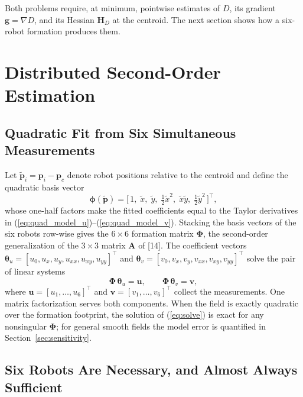 \documentclass[lettersize,journal]{IEEEtran}
\begin{document}
Both problems require, at minimum, pointwise estimates of $D$, its
gradient $\mathbf{g} = \nabla D$, and its Hessian $\mathbf{H}_D$ at the
centroid. The next section shows how a six-robot formation produces them.


\section{Distributed Second-Order Estimation}
\label{sec:estimation}

\subsection{Quadratic Fit from Six Simultaneous Measurements}

Let $\tilde{\mathbf{p}}_i = \mathbf{p}_i - \mathbf{p}_c$ denote robot
positions relative to the centroid and define the quadratic basis vector
\begin{equation}
    \boldsymbol{\phi}(\tilde{\mathbf{p}}) =
    \bigl[\,1, \; \tilde{x}, \; \tilde{y}, \; \tfrac{1}{2}\tilde{x}^2, \;
    \tilde{x}\tilde{y}, \; \tfrac{1}{2}\tilde{y}^2\,\bigr]^\top,
    \label{eq:basis}
\end{equation}
whose one-half factors make the fitted coefficients equal to the Taylor
derivatives in (\ref{eq:quad_model_u})--(\ref{eq:quad_model_v}). Stacking
the basis vectors of the six robots row-wise gives the $6 \times 6$
formation matrix $\boldsymbol{\Phi}$, the second-order generalization of
the $3 \times 3$ matrix $\mathbf{A}$ of [14]. The coefficient vectors
$\boldsymbol{\theta}_u = [u_0, u_x, u_y, u_{xx}, u_{xy}, u_{yy}]^\top$ and
$\boldsymbol{\theta}_v = [v_0, v_x, v_y, v_{xx}, v_{xy}, v_{yy}]^\top$
solve the pair of linear systems
\begin{equation}
    \boldsymbol{\Phi}\,\boldsymbol{\theta}_u = \mathbf{u}, \qquad
    \boldsymbol{\Phi}\,\boldsymbol{\theta}_v = \mathbf{v},
    \label{eq:solve}
\end{equation}
where $\mathbf{u} = [u_1, \ldots, u_6]^\top$ and $\mathbf{v} = [v_1,
\ldots, v_6]^\top$ collect the measurements. One matrix factorization
serves both components. When the field is exactly quadratic over the
formation footprint, the solution of (\ref{eq:solve}) is exact for any
nonsingular $\boldsymbol{\Phi}$; for general smooth fields the model
error is quantified in Section~\ref{sec:sensitivity}.

\subsection{Six Robots Are Necessary, and Almost Always Sufficient}
\end{document}
